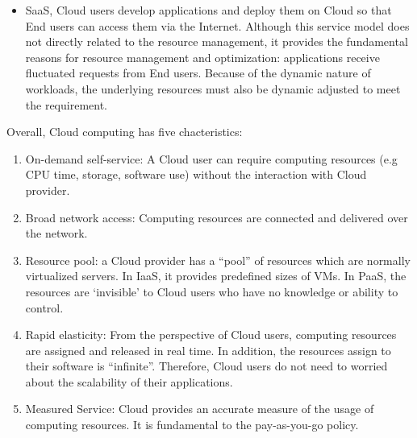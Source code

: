 \begin{itemize}


 	\item SaaS, Cloud users develop applications and deploy them on Cloud so that End users can access them via the Internet. Although this service model does not directly related to the resource management, it provides the fundamental reasons for resource management and optimization: applications receive fluctuated requests from End users. Because of the dynamic nature of workloads, the underlying resources must also be dynamic adjusted to meet the requirement.
\end{itemize}

Overall, Cloud computing has five chacteristics:
\begin{enumerate}
 \item On-demand self-service: A Cloud user can require computing resources (e.g CPU time, storage, software use) without the interaction with Cloud provider.
 \item Broad network access: Computing resources are connected and delivered over the network.
 \item Resource pool: a Cloud provider has a ``pool'' of resources which are normally virtualized servers. In IaaS, it provides predefined sizes of VMs. In PaaS, the resources are `invisible' to Cloud users who have no knowledge or ability to control. 
 \item Rapid elasticity: From the perspective of Cloud users, computing resources are assigned and released in real time. In addition, the resources assign to their software is ``infinite''. Therefore, Cloud users do not need to worried about the scalability of their applications.
 \item Measured Service: Cloud provides an accurate measure of the usage of computing resources. It is fundamental to the pay-as-you-go policy.
\end{enumerate}



